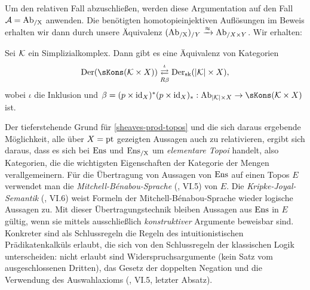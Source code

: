 Um den relativen Fall abzuschließen, werden diese Argumentation auf
den Fall $\mathcal{A} = \operatorname{Ab_{/X}}$ anwenden. Die benötigten
homotopieinjektiven Auflösungen im Beweis erhalten wir dann durch
unsere Äquivalenz $(\operatorname{Ab_{/X}})_{/Y} \xrightarrow{\approx} \operatorname{Ab}_{/X \times Y}$. Wir erhalten:
\begin{theorem} \label{dersk-eq-rel}
  Sei $\mathcal{K}$ ein Simplizialkomplex. Dann gibt es eine Äquivalenz von
  Kategorien
  \[ \Der(\sKons(\K \times X))
     \mathrel{\mathop{\rightleftarrows}^{\iota}_{R \beta}}
     \Der_{\mathrm{sk}}(|\K| \times X),
  \]
  wobei $\iota$ die Inklusion und $\beta = (p \times \id_X)^* (p
  \times \id_X)_*: \Ab_{|\K| \times X} \to \sKons(\K \times X)$ ist.
\end{theorem}
\begin{bem}
  Der tieferstehende Grund für \ref{sheaves-prod-topos} und die sich
  daraus ergebende Möglichkeit, alle über $X = \operatorname{pt}$ gezeigten
  Aussagen auch zu relativieren, ergibt sich daraus, dass es sich bei
  $\operatorname{Ens}$ und $\operatorname{Ens_{/X}}$ um \emph{elementare Topoi} handelt, also
  Kategorien, die die wichtigsten Eigenschaften der Kategorie der
  Mengen verallgemeinern. Für die Übertragung von Aussagen von $\operatorname{Ens}$
  auf einen Topos $E$ verwendet man die
  \emph{Mitchell-Bénabou-Sprache} (\cite{MoerTopoi}, VI.5) von
  $E$. Die \emph{Kripke-Joyal-Semantik} (\cite{MoerTopoi}, VI.6) weist
  Formeln der Mitchell-Bénabou-Sprache wieder logische Aussagen
  zu. Mit dieser Übertragungstechnik bleiben Aussagen aus $\operatorname{Ens}$ in
  $E$ gültig, wenn sie mittels ausschließlich \emph{konstruktiver}
  Argumente beweisbar sind. Konkreter sind als Schlussregeln die
  Regeln des intuitionistischen Prädikatenkalküls erlaubt, die sich
  von den Schlussregeln der klassischen Logik unterscheiden: nicht
  erlaubt sind Widerspruchsargumente (kein Satz vom ausgeschlossenen
  Dritten), das Gesetz der doppelten Negation und die Verwendung des
  Auswahlaxioms (\cite{MoerTopoi}, VI.5, letzter Absatz).
\end{bem}
